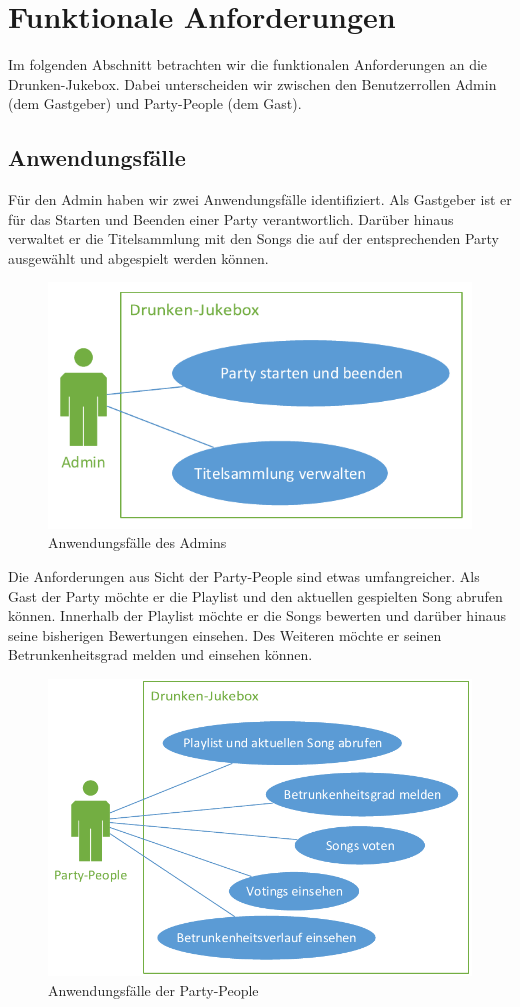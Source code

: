 \section{Funktionale Anforderungen}
Im folgenden Abschnitt betrachten wir die funktionalen Anforderungen an die Drunken-Jukebox. Dabei unterscheiden wir zwischen den Benutzerrollen Admin (dem Gastgeber) und Party-People (dem Gast).  

\subsection{Anwendungsfälle}
Für den Admin haben wir zwei Anwendungsfälle identifiziert. Als Gastgeber ist er für das Starten und Beenden einer Party verantwortlich. Darüber hinaus verwaltet er die Titelsammlung mit den Songs die auf der entsprechenden Party ausgewählt und abgespielt werden können.

\begin{figure}[H]
\centering
\includegraphics[width=0.75\linewidth]{Bilder/AdminUseCase}
\caption{Anwendungsfälle des Admins}
\label{fig:AdminUseCase}
\end{figure}

Die Anforderungen aus Sicht der Party-People sind etwas umfangreicher. Als Gast der Party möchte er die Playlist und den aktuellen gespielten Song abrufen können. Innerhalb der Playlist möchte er die Songs bewerten und darüber hinaus seine bisherigen Bewertungen einsehen. Des Weiteren möchte er seinen Betrunkenheitsgrad melden und einsehen können.

\begin{figure}[H]
\centering
\includegraphics[width=0.95\linewidth]{Bilder/PartyPeopleUseCase}
\caption{Anwendungsfälle der Party-People}
\label{fig:PartyPeopleUseCase}
\end{figure}

